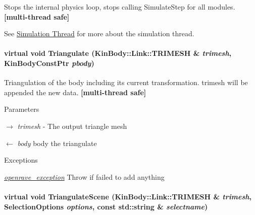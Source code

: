 Stops the internal physics loop, stops calling SimulateStep for all modules. {\bfseries \mbox{[}multi-\/thread safe\mbox{]}} 

See \hyperlink{architecture__concepts_arch_simulation}{Simulation Thread} for more about the simulation thread. \hypertarget{classOpenRAVE_1_1EnvironmentBase_a19e34289d58ae5adeabd8fd431986dd5}{
\paragraph[{Triangulate}]{\setlength{\rightskip}{0pt plus 5cm}virtual void Triangulate ({\bf KinBody::Link::TRIMESH} \& {\em trimesh}, \/  KinBodyConstPtr {\em pbody})}\hfill}
\label{classOpenRAVE_1_1EnvironmentBase_a19e34289d58ae5adeabd8fd431986dd5}


Triangulation of the body including its current transformation. trimesh will be appended the new data. {\bfseries \mbox{[}multi-\/thread safe\mbox{]}} 


\begin{DoxyParams}{Parameters}
\item[\mbox{$\rightarrow$} {\em trimesh}]-\/ The output triangle mesh \item[\mbox{$\leftarrow$} {\em body}]body the triangulate \end{DoxyParams}

\begin{DoxyExceptions}{Exceptions}
\item[{\em \hyperlink{classOpenRAVE_1_1openrave__exception}{openrave\_\-exception}}]Throw if failed to add anything \end{DoxyExceptions}
\hypertarget{classOpenRAVE_1_1EnvironmentBase_a9773d98d124c6fcbfbcc1aa47ee4967e}{
\paragraph[{TriangulateScene}]{\setlength{\rightskip}{0pt plus 5cm}virtual void TriangulateScene ({\bf KinBody::Link::TRIMESH} \& {\em trimesh}, \/  {\bf SelectionOptions} {\em options}, \/  const std::string \& {\em selectname})}\hfill}
\label{classOpenRAVE_1_1EnvironmentBase_a9773d98d124c6fcbfbcc1aa47ee4967e}


